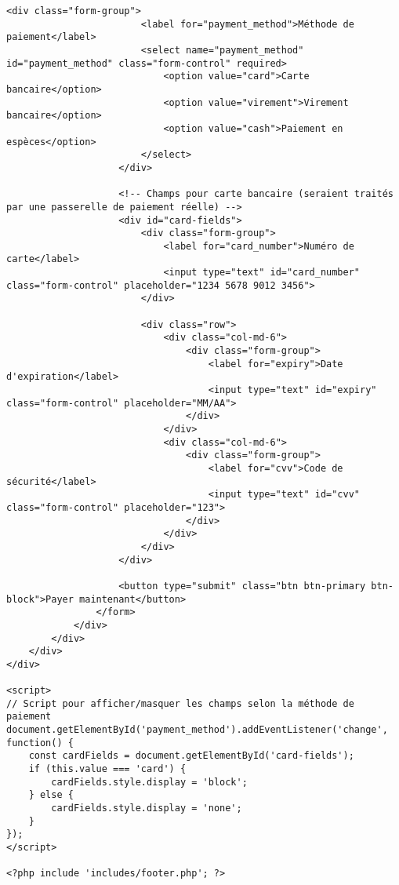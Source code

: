 \documentclass[12pt,a4paper]{report}
\begin{document}
\begin{lstlisting}[style=phpStyle, caption=Extrait de payment.php - Traitement des paiements]
                    <div class="form-group">
                        <label for="payment_method">Méthode de paiement</label>
                        <select name="payment_method" id="payment_method" class="form-control" required>
                            <option value="card">Carte bancaire</option>
                            <option value="virement">Virement bancaire</option>
                            <option value="cash">Paiement en espèces</option>
                        </select>
                    </div>
                    
                    <!-- Champs pour carte bancaire (seraient traités par une passerelle de paiement réelle) -->
                    <div id="card-fields">
                        <div class="form-group">
                            <label for="card_number">Numéro de carte</label>
                            <input type="text" id="card_number" class="form-control" placeholder="1234 5678 9012 3456">
                        </div>
                        
                        <div class="row">
                            <div class="col-md-6">
                                <div class="form-group">
                                    <label for="expiry">Date d'expiration</label>
                                    <input type="text" id="expiry" class="form-control" placeholder="MM/AA">
                                </div>
                            </div>
                            <div class="col-md-6">
                                <div class="form-group">
                                    <label for="cvv">Code de sécurité</label>
                                    <input type="text" id="cvv" class="form-control" placeholder="123">
                                </div>
                            </div>
                        </div>
                    </div>
                    
                    <button type="submit" class="btn btn-primary btn-block">Payer maintenant</button>
                </form>
            </div>
        </div>
    </div>
</div>

<script>
// Script pour afficher/masquer les champs selon la méthode de paiement
document.getElementById('payment_method').addEventListener('change', function() {
    const cardFields = document.getElementById('card-fields');
    if (this.value === 'card') {
        cardFields.style.display = 'block';
    } else {
        cardFields.style.display = 'none';
    }
});
</script>

<?php include 'includes/footer.php'; ?>
\end{lstlisting}
\end{document}
